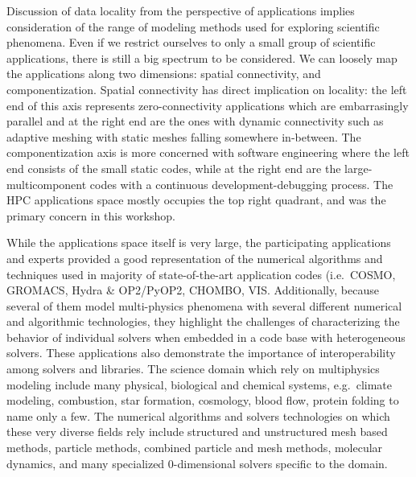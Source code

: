 %
%
$ $\\
\noindent
Discussion of data locality from the perspective of applications implies
consideration of the range of modeling methods used for exploring
scientific phenomena. Even if we restrict ourselves to only a small
group of scientific applications, there is still a big spectrum to be
considered. We can loosely map the applications along two dimensions:
spatial connectivity, and componentization. Spatial connectivity has
direct implication on locality: the left end of this axis represents
zero-connectivity applications which are embarrasingly parallel and at
the right end are the ones with dynamic connectivity such as adaptive
meshing with static meshes falling somewhere in-between. The componentization
axis is more concerned with software engineering where the left end
consists of the small static codes, while at the right end are the
large-multicomponent  codes with a continuous development-debugging
process. The HPC applications space mostly occupies the top right
quadrant, and was the primary concern in this workshop. 

While the applications space itself is very
large, the participating applications and experts provided a good
representation of the numerical algorithms and techniques used in
majority of state-of-the-art application codes (i.e.\ COSMO\cite{cosmo},
GROMACS\cite{gromacs4,gromacs4.5,gromacs-exascale}, Hydra \&
OP2/PyOP2\cite{Hydra, PyOP2}, CHOMBO\cite{chombo}, VIS\cite{vis}. 
Additionally, because several of them model
multi-physics phenomena with several different numerical and
algorithmic technologies, they highlight the challenges of
characterizing the behavior of individual solvers when embedded in a
code base with heterogeneous solvers. %
These applications also demonstrate the importance of interoperability
among solvers and libraries. The science domain which rely on multiphysics modeling
include many physical, biological and chemical systems, e.g.\ climate
modeling, combustion, star formation, cosmology, blood flow, protein
folding to name only a few. The numerical algorithms and solvers
technologies on which these very diverse fields rely include
structured and unstructured mesh based methods, particle methods,
combined particle and mesh methods, molecular dynamics,  and many
specialized 0-dimensional solvers specific to the domain. 

